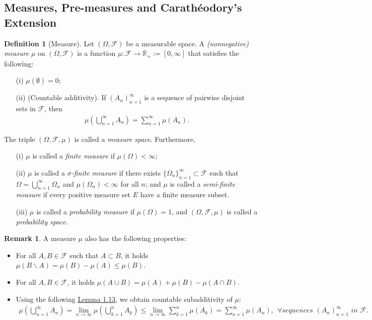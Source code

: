 \documentclass{article}
\numberwithin{equation}{section}
\theoremstyle{plain}
\theoremstyle{definition}
\newtheorem{definition}[theorem]{Definition}
\newtheorem*{remark}{Remark}
\begin{document}
\newpage
\subsection{Measures, Pre-measures and Carathéodory's Extension}
\begin{definition}[Measure]\label{def:1.12}
Let $(\Omega,\mathscr{F})$ be a measurable space. A \textit{(nonnegative)  measure} $\mu$ on $(\Omega,\mathscr{F})$ is a function $\mu:\mathscr{F}\to\overline{\mathbb{R}}_+:=[0,\infty]$ that satisfies the following:
\begin{itemize}
	\item[(i)] $\mu(\emptyset)=0$;
	\item[(ii)] (Countable additivity). If $(A_n)_{n=1}^\infty$ is a sequence of pairwise disjoint sets in $\mathscr{F}$, then
	\begin{align*}
		\mu\left(\bigcup_{n=1}^\infty A_n\right) = \sum_{n=1}^\infty \mu(A_n).
	\end{align*}
\end{itemize}
The triple $(\Omega,\mathscr{F},\mu)$ is called a \textit{measure space}. Furthermore, 
\begin{itemize}
\item [(i)] $\mu$ is called a \textit{finite measure} if $\mu(\Omega)<\infty$; \item [(ii)] $\mu$ is called a \textit{$\sigma$-finite measure} if there exists $\{\Omega_n\}_{n=1}^\infty\subset\mathscr{F}$ such that $\Omega=\bigcup_{n=1}^\infty\Omega_n$ and $\mu(\Omega_n)<\infty$ for all $n$; and $\mu$ is called a \textit{semi-finite measure} if every positive measure set $E$ have a finite measure subset.
\item[(iii)] $\mu$ is called a \textit{probability measure} if $\mu(\Omega)=1$, and $(\Omega,\mathscr{F},\mu)$ is called a \textit{probability space}.
\end{itemize}
\end{definition}

\begin{remark}
A measure $\mu$ also has the following properties:
\begin{itemize}
	\item For all $A,B\in\mathscr{F}$ such that $A\subset B$, it holds $\mu(B\backslash A)=\mu(B)-\mu(A)\leq\mu(B)$.
	\item For all $A,B\in\mathscr{F}$, it holds $\mu(A\cup B) = \mu(A)+\mu(B)-\mu(A\cap B)$.
	\item Using the following \hyperref[lemma:1.13]{Lemma 1.13}, we obtain countable subadditivity of $\mu$:
	\begin{align*}
		\mu\left(\bigcup_{n=1}^\infty A_n\right) = \lim_{n\to\infty}\mu\left(\bigcup_{k=1}^{n}A_k\right) \leq \lim_{n\to\infty}\sum_{k=1}^n\mu(A_k) = \sum_{n=1}^\infty \mu(A_n),\ \  \forall \textit{sequences $(A_n)_{n=1}^\infty$ in $\mathscr{F}$}.
	\end{align*}
\end{itemize}
\end{remark}
\end{document}
